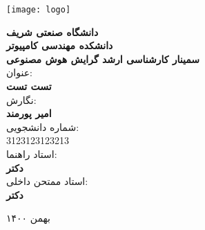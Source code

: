 \thispagestyle{empty}
\begin{center}
\texttt{[image: logo]}
\vskip 1cm

\large{
{\bf
دانشگاه صنعتی شریف\\ دانشکده مهندسی کامپیوتر\\ سمینار کارشناسی ارشد گرایش هوش مصنوعی
}
\\
\vskip 1cm
عنوان:\\
{ \bf
تست تست
}
\\{ \bf \large
{}}
\vskip 1cm
نگارش:\\
\textbf{امیر پورمند}
\\
\vskip 0.5cm
شماره دانشجویی: \\
3123123123213
\\
\vskip 1cm
استاد راهنما:\\
 \textbf{دکتر  }
 \\
\vskip 1cm
استاد ممتحن داخلی:\\
\textbf{دکتر  }
\\

\vskip 3.5cm

}
بهمن ۱۴۰۰
\newpage
\end{center}


